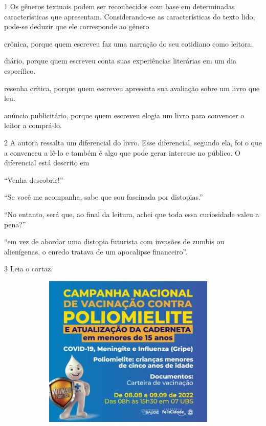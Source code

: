 \num{1} Os gêneros textuais podem ser reconhecidos com base em
determinadas características que apresentam. Considerando-se as
características do texto lido, pode-se deduzir que ele corresponde ao gênero

\begin{escolha}
\item
  crônica, porque quem escreveu faz uma narração do seu cotidiano como
  leitora.
\item
  diário, porque quem escreveu conta suas experiências literárias em um
  dia específico.
\item
  resenha crítica, porque quem escreveu apresenta sua avaliação sobre um
  livro que leu.
\item
  anúncio publicitário, porque quem escreveu elogia um livro para
  convencer o leitor a comprá-lo.
\end{escolha}

\pagebreak

\num{2} A autora ressalta um diferencial do livro. Esse diferencial,
segundo ela, foi o que a convenceu a lê-lo e também é algo que pode gerar interesse no
público. O diferencial está descrito em

\begin{escolha}
\item ``Venha descobrir!''

\item ``Se você me acompanha, sabe que sou fascinada por distopias.''

\item ``No entanto, será que, ao final da leitura, achei que toda essa
curiosidade valeu a pena?''

\item ``em vez de abordar uma distopia futurista com invasões de zumbis ou
alienígenas, o enredo tratava de um apocalipse financeiro''.
\end{escolha}

\num{3} Leia o cartaz.

\begin{figure}[H]
\centering
\includegraphics[width=4.21103in,height=2.86458in]{./imgSAEB_8_POR/media/image40.png}
\end{figure}

